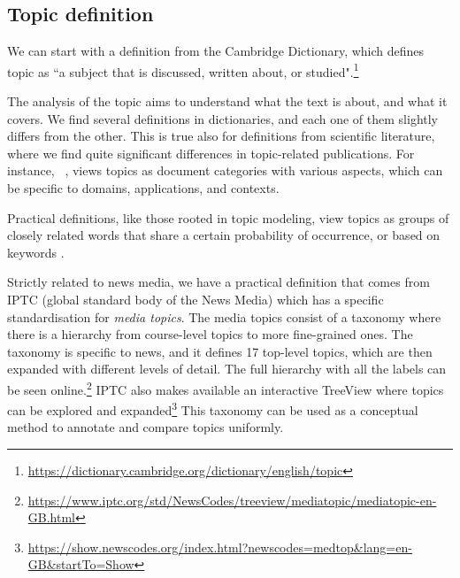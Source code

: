 
\subsection{\statusgreen Topic definition}
\label{sec:lit_topics_def}

We can start with a definition from the Cambridge Dictionary, which defines topic as ``a subject that is discussed, written about, or studied".\footnote{\url{https://dictionary.cambridge.org/dictionary/english/topic}}

The analysis of the topic aims to understand what the text is about, and what it covers. We find several definitions in dictionaries, and each one of them slightly differs from the other.
This is true also for definitions from scientific literature, where we find quite significant differences in topic-related publications.
For instance, %
~\citet{ding2011community}, views topics as document categories with various aspects, which can be specific to domains, applications, and contexts.

Practical definitions, like those rooted in topic modeling, view topics as groups of closely related words that share a certain probability of occurrence\citep{blei2003latent,blei2006correlated,blei2012probabilistic}, or based on keywords \citep{erten2004exploring,decker2007detection}.


Strictly related to news media, we have a practical definition that comes from IPTC (global standard body of the News Media) which has a specific standardisation for \emph{media topics}.
The media topics consist of a taxonomy where there is a hierarchy from course-level topics to more fine-grained ones.
The taxonomy is specific to news, and it defines 17 top-level topics, which are then expanded with different levels of detail.
The full hierarchy with all the labels can be seen online.\footnote{\url{https://www.iptc.org/std/NewsCodes/treeview/mediatopic/mediatopic-en-GB.html}}
IPTC also makes available an interactive TreeView where topics can be explored and expanded\footnote{\url{https://show.newscodes.org/index.html?newscodes=medtop&lang=en-GB&startTo=Show}}
This taxonomy can be used as a conceptual method to annotate and compare topics uniformly.

